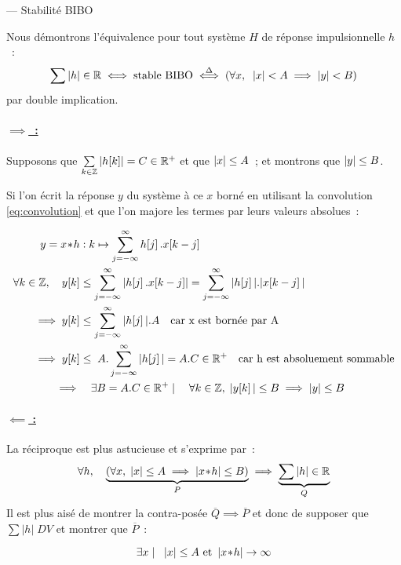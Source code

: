 \begin{demo} --- Stabilité BIBO

  
  Nous démontrons l'équivalence pour tout système $H$ de réponse
  impulsionnelle $h$~:
  $$ \sum \left|h\right|\in\mathbb{R} \iff \text{stable BIBO} \overset{\Delta}{\iff} \left(\forall x, \;\;\left|x\right|<A \implies \left|y\right|<B\right)$$  par
  double implication.
  
  \paragraph{\underline{$\implies$~:}}
  Supposons que $\sum\limits_{k\in\mathbb{Z}} \left|h\!\left[k\right]\right|=C\in\mathbb{R}^+$
  et que $\left|x\right|\leq A$~; et montrons que $\left|y\right|\leq B$.

  Si l'on écrit la réponse $y$ du système à ce $x$ borné en utilisant
  la convolution \eqref{eq:convolution} et que l'on majore les termes
  par leurs valeurs absolues~:

  \begin{align*}
    y=x\conv{}h &: k\mapsto \somme{j=-\infty}{\infty}{h\ded{j}.x\ded{k-j}} \\
    \forall k\in\Z,\quad y\ded{k} & \leq \somme{j=-\infty}{\infty}{\left|h\ded{j}.x\ded{k-j}\right|} = \somme{j=-\infty}{\infty}{|h\ded{j}|.|x\ded{k-j}|}\\
    \implies  y\ded{k} & \leq \somme{j=-\infty}{\infty}{|h\ded{j}| . A}\quad \text{car x est bornée par A}\\
    \implies  y\ded{k} & \leq \;A.\somme{j=-\infty}{\infty}{|h\ded{j}|} = A.C \in \R^+\quad \text{car h est absoluement sommable}\\
    \implies & \quad\exists B=A.C\in\R^+ \mathrel{}\mid\mathrel{}\quad \forall k\in\Z, \; |y\ded{k}|\leq B \implies \abs{y}\leq B
  \end{align*}

  \paragraph{\underline{$\impliedby$ :}}
  La réciproque est plus astucieuse et s'exprime par~:
  $$\forall h,\quad \underbrace{\left(\forall x,\; \left|x\right|\leq A \implies \left|x\!\ast\! h\right|\leq B\right)}_{P} \implies \underbrace{\sum|h|\in\mathbb{R}}_{Q}$$
  Il est plus aisé de montrer la contra-posée
  $\overline{Q}\implies\overline{P}$ et donc de supposer que
  $\sum|h|\; DV$ et montrer que $\overline{P}$~:

  $$\exists x \mathrel{}\mid\mathrel{} \;\; \left|x\right|\leq A \text{ et } \left|x\!\ast\! h\right|\to\infty $$
  

\end{demo}
